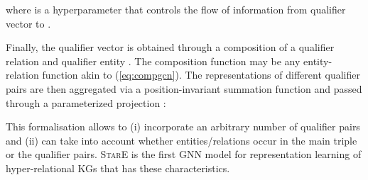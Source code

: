 \documentclass[11pt,a4paper]{article}
\begin{document}
where  is a hyperparameter that controls
the flow of information from qualifier vector  to .


Finally, the qualifier vector  is obtained through a composition  of a qualifier relation  and qualifier entity . 
The composition function  may be any entity-relation function akin to  (\autoref{eq:compgcn}).
The representations of different qualifier pairs are then aggregated via a position-invariant summation function and passed through a parameterized projection :







This formalisation allows to (i) incorporate an arbitrary number of qualifier pairs and (ii) can take into account whether entities/relations occur in the main triple or the qualifier pairs. \textsc{StarE} is the first GNN model for representation learning of hyper-relational KGs that has these characteristics.  



\begin{table*}[t]
\centering
\caption{Datasets - E in quals (R in quals) denote the amount of entities (relations) appearing only in qualifiers.}
\label{tab:datasets}
\end{table*}
\end{document}
